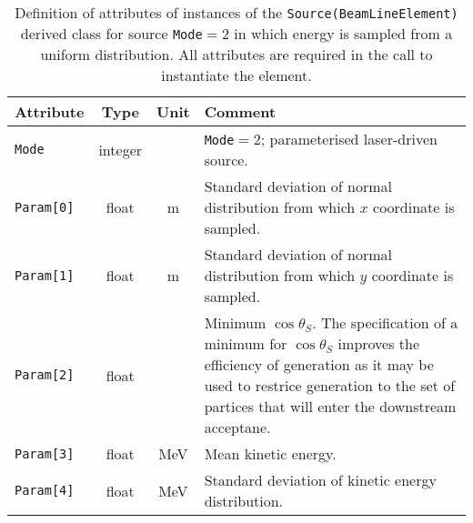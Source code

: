 \begin{table}[h]
  \caption{
    Definition of attributes of instances of
    the \texttt{Source(BeamLineElement)} derived class for
    source \texttt{Mode}$=2$ in which energy is sampled from a uniform
    distribution.
    All attributes are required in the call to instantiate the
    element.
  }
  \label{Tab:Source:AttributesC}
  \begin{center}
    \begin{tabular}{|l|c|c|p{10cm}|}
      \hline
      \textbf{Attribute} & \textbf{Type}      & \textbf{Unit} & \textbf{Comment}                    \\
      \hline
      \texttt{Mode}      & integer &          & \texttt{Mode}$=2$; parameterised laser-driven source.        \\
      \hline
       \texttt{Param[0]} & float   & m        & Standard deviation of normal distribution from which $x$ coordinate is sampled. \\
       \texttt{Param[1]} & float   & m        & Standard deviation of normal distribution from which $y$ coordinate is sampled. \\
       \texttt{Param[2]} & float   &          & Minimum $\cos\theta_S$.
                                                The specification of a minimum for $\cos\theta_S$ improves the efficiency of
                                                generation as it may be used to restrice generation to the set of partices that
                                                will enter the downstream acceptane.                                            \\
       \texttt{Param[3]} & float   & MeV      & Mean kinetic energy.                                          \\
       \texttt{Param[4]} & float   & MeV      & Standard deviation of kinetic energy distribution.            \\
      \hline
    \end{tabular}
  \end{center}
\end{table}
